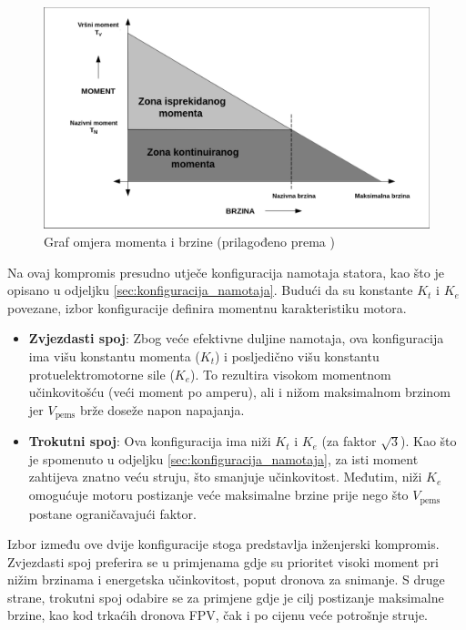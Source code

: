 \documentclass[diplomskirad]{fer}
\begin{document}
\begin{figure}[h!]
	\centering
	\includegraphics[width=\textwidth]{Figures/microchip_torque_speed.png}
	\caption{Graf omjera momenta i brzine (prilagođeno prema \cite{MicrochipAN885})}
	\label{fig:torque_speed}
\end{figure}

Na ovaj kompromis presudno utječe konfiguracija namotaja statora, kao što je
opisano u odjeljku \ref{sec:konfiguracija_namotaja}. Budući da su konstante
$K_t$ i $K_e$ povezane, izbor konfiguracije definira momentnu karakteristiku
motora.

\begin{itemize}
	\item \textbf{Zvjezdasti spoj}: Zbog veće efektivne duljine namotaja, ova konfiguracija ima višu konstantu momenta ($K_t$) i posljedično višu konstantu protuelektromotorne sile ($K_e$). To rezultira visokom momentnom učinkovitošću (veći moment po amperu), ali i nižom maksimalnom brzinom jer $V_{\text{pems}}$ brže doseže napon napajanja.

	\item \textbf{Trokutni spoj}: Ova konfiguracija ima niži $K_t$ i $K_e$ (za faktor $\sqrt{3}$). Kao što je spomenuto u odjeljku \ref{sec:konfiguracija_namotaja}, za isti moment zahtijeva znatno veću struju, što smanjuje učinkovitost. Međutim, niži $K_e$ omogućuje motoru postizanje veće maksimalne brzine prije nego što $V_{\text{pems}}$ postane ograničavajući faktor.
\end{itemize}

Izbor između ove dvije konfiguracije stoga predstavlja inženjerski kompromis.
Zvjezdasti spoj preferira se u primjenama gdje su prioritet visoki moment pri
nižim brzinama i energetska učinkovitost, poput dronova za snimanje. S druge
strane, trokutni spoj odabire se za primjene gdje je cilj postizanje maksimalne
brzine, kao kod trkaćih dronova FPV, čak i po cijenu veće potrošnje struje.
\end{document}
